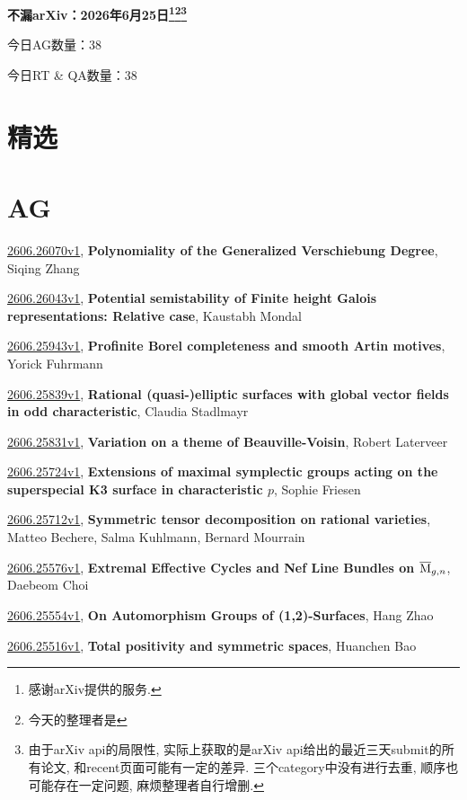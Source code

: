 \documentclass[9pt, a4paper]{article}
\theoremstyle{plain}
\theoremstyle{definition}
\theoremstyle{remark}
\newcommand{\arxiv}[3]{\href{https://arxiv.org/abs/#1}{#1}, \textbf{\textcolor{arxivblue}{#2}}, #3}
\newcommand{\AGnumber}{38}
\newcommand{\RTQAnumber}{38}
\newcommand{\NewestDate}{2026年6月25日}
\newcommand{\todayarXiver}{} %
\begin{document}
\begin{center}
    \Huge\textbf{不漏arXiv：\NewestDate\footnote{感谢arXiv提供的服务.}\footnote{今天的整理者是\todayarXiver}\footnote{由于arXiv api的局限性, 实际上获取的是arXiv api给出的最近三天submit的所有论文, 和recent页面可能有一定的差异. 三个category中没有进行去重, 顺序也可能存在一定问题, 麻烦整理者自行增删.}} \\
\end{center}

\setcounter{section}{-1}

\begin{center}
    今日AG数量：\AGnumber
    
    今日RT \& QA数量：\RTQAnumber
    
\end{center}


\section{精选}


\section{AG}
\arxiv{2606.26070v1}{Polynomiality of the Generalized Verschiebung Degree}{Siqing Zhang}

\arxiv{2606.26043v1}{Potential semistability of Finite height Galois representations: Relative case}{Kaustabh Mondal}

\arxiv{2606.25943v1}{Profinite Borel completeness and smooth Artin motives}{Yorick Fuhrmann}

\arxiv{2606.25839v1}{Rational (quasi-)elliptic surfaces with global vector fields in odd characteristic}{Claudia Stadlmayr}

\arxiv{2606.25831v1}{Variation on a theme of Beauville-Voisin}{Robert Laterveer}

\arxiv{2606.25724v1}{Extensions of maximal symplectic groups acting on the superspecial K3 surface in characteristic $p$}{Sophie Friesen}

\arxiv{2606.25712v1}{Symmetric tensor decomposition on rational varieties}{Matteo Bechere, Salma Kuhlmann, Bernard Mourrain}

\arxiv{2606.25576v1}{Extremal Effective Cycles and Nef Line Bundles on \(\overline{\rm{M}}_{g,n}\)}{Daebeom Choi}

\arxiv{2606.25554v1}{On Automorphism Groups of (1,2)-Surfaces}{Hang Zhao}

\arxiv{2606.25516v1}{Total positivity and symmetric spaces}{Huanchen Bao}
\end{document}
